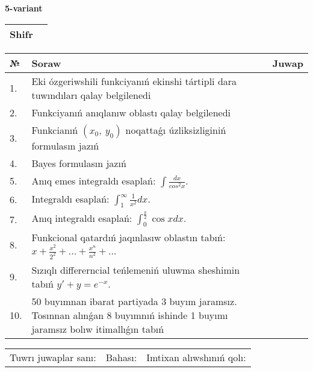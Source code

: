 \documentclass{article}
\begin{document}
  \egroup
  
  \newpage
  
  
  \textbf{5-variant}\\
  
  \bgroup
  \def\arraystretch{1.6} %
  
  \begin{tabular}{|m{5.7cm}|m{9.5cm}|}
  \hline
  Shifr & \\
  \hline
  \end{tabular}
  
  \vspace{1cm}
  
  \begin{tabular}{|m{0.7cm}|m{10cm}|m{4cm}|}
  \hline
  № & Soraw & Juwap \\
  \hline
  1. & Eki ózgeriwshili funkciyanıń ekinshi tártipli dara tuwındıları qalay belgilenedi &  \\
  \hline
  2. & Funkciyanıń anıqlanıw oblastı qalay belgilenedi &  \\
  \hline
  3. & Funkcianıń \((x_{0},\ y_{0})\) noqattaǵı úzliksizliginiń formulasın jazıń &  \\
  \hline
  4. & Bayes formulasın jazıń &  \\
  \hline
  5. & Anıq emes integraldı esaplań: \(\int\frac{dx}{cos^2 x}\). &  \\
  \hline
  6. & Integraldı esaplań: \(\int_{1}^{\infty}{\frac{1}{x^2 }dx}\). &  \\
  \hline
  7. & Anıq integraldı esaplań: \(\int_{0}^{\frac{\pi}{2}}{\cos xdx}\). &  \\
  \hline
  8. & Funkcional qatardıń jaqınlasıw oblastın tabıń: \(x + \frac{x^2 }{2^2 } + ... + \frac{x^{n}}{n^2 } + ...\) &  \\
  \hline
  9. & Sızıqlı differerncial teńlemeniń uluwma sheshimin tabıń \(y' + y = e^{- x}\). &  \\
  \hline
  10. & 50 buyımnan ibarat partiyada 3 buyım jaramsız. Tosınnan alınǵan 8 buyımnıń ishinde 1 buyımı jaramsız bolıw itimallıǵın tabıń &  \\
  \hline
  \end{tabular}
  
  \vspace{1cm}
  
  \begin{tabular}{lll}
  Tuwrı juwaplar sanı: \underline{\hspace{1.5cm}} & 
  Bahası: \underline{\hspace{1.5cm}} & 
  Imtixan alıwshınıń qolı: \underline{\hspace{2cm}} \\
  \end{tabular}
  
\end{document}
